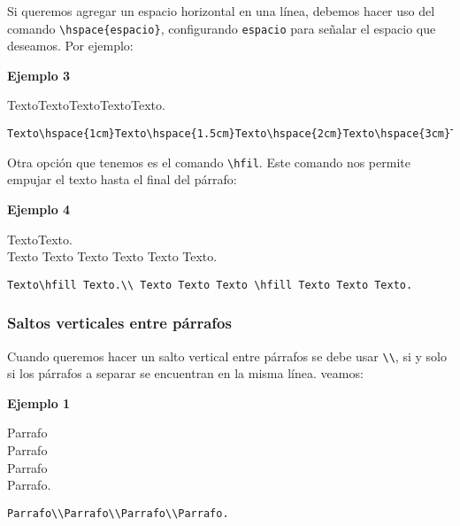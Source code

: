 	Si queremos agregar un espacio horizontal en una línea, debemos hacer uso del comando \verb|\hspace{espacio}|, configurando \texttt{espacio} para señalar el espacio que deseamos. Por ejemplo:
	
	\textbf{Ejemplo 3}
	
	Texto\hspace{1cm}Texto\hspace{1.5cm}Texto\hspace{2cm}Texto\hspace{3cm}Texto.
	\begin{myquote}
		\begin{lstlisting}
Texto\hspace{1cm}Texto\hspace{1.5cm}Texto\hspace{2cm}Texto\hspace{3cm}Texto.
		\end{lstlisting}
	\end{myquote}
	
	
	Otra opción que tenemos es el comando \verb|\hfil|. Este comando nos permite empujar el texto hasta el final del párrafo:
	
	\textbf{Ejemplo 4}
	
	\begin{minipage}{\textwidth}
		Texto\hfill Texto.\\ Texto Texto Texto \hfill Texto Texto Texto.
	\end{minipage}	
	\begin{myquote}
		\begin{lstlisting}
Texto\hfill Texto.\\ Texto Texto Texto \hfill Texto Texto Texto.
		\end{lstlisting}
	\end{myquote}
	
	
	\subsubsection{Saltos verticales entre párrafos}
	
	Cuando queremos hacer un salto vertical entre párrafos se debe usar \verb|\\|, si y solo si los párrafos a separar se encuentran en la misma línea. veamos:
	
	\textbf{Ejemplo 1}
	
	\begin{minipage}{\textwidth}
		Parrafo\\Parrafo\\Parrafo\\Parrafo.
	\end{minipage}	
	\begin{myquote}
		\begin{lstlisting}
Parrafo\\Parrafo\\Parrafo\\Parrafo.
		\end{lstlisting}
	\end{myquote}
		
